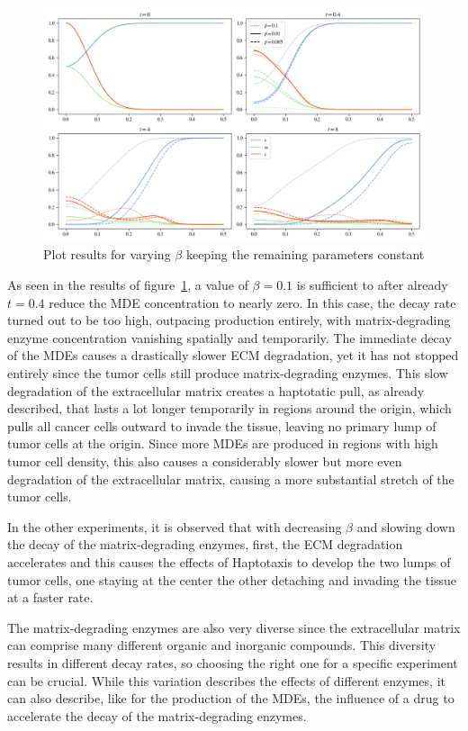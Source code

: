 \begin{figure}[h]
 \centering
 \includegraphics[width=\textwidth]{resources/images/beta_variation.png}
 \caption{Plot results for varying $\beta$ keeping the remaining parameters constant}
 \label{fig:beta_variation}
\end{figure}
As seen in the results of figure~\ref{fig:beta_variation}, a value of $\beta=0.1$ is sufficient to after already $t=0.4$ reduce the MDE concentration to nearly zero. In this case, the decay rate turned out to be too high, outpacing production entirely, with matrix-degrading enzyme concentration vanishing spatially and temporarily. The immediate decay of the MDEs causes a drastically slower ECM degradation, yet it has not stopped entirely since the tumor cells still produce matrix-degrading enzymes. This slow degradation of the extracellular matrix creates a haptotatic pull, as already described, that lasts a lot longer temporarily in regions around the origin, which pulls all cancer cells outward to invade the tissue, leaving no primary lump of tumor cells at the origin. Since more MDEs are produced in regions with high tumor cell density, this also causes a considerably slower but more even degradation of the extracellular matrix, causing a more substantial stretch of the tumor cells.

In the other experiments, it is observed that with decreasing $\beta$ and slowing down the decay of the matrix-degrading enzymes, first, the ECM degradation accelerates and this causes the effects of Haptotaxis to develop the two lumps of tumor cells, one staying at the center the other detaching and invading the tissue at a faster rate.

The matrix-degrading enzymes are also very diverse since the extracellular matrix can comprise many different organic and inorganic compounds. This diversity results in different decay rates, so choosing the right one for a specific experiment can be crucial. While this variation describes the effects of different enzymes, it can also describe, like for the production of the MDEs, the influence of a drug to accelerate the decay of the matrix-degrading enzymes.


